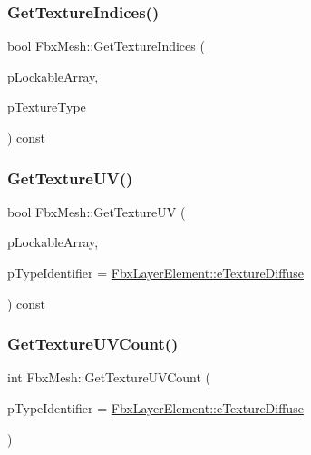 \subsubsection{\texorpdfstring{Get\+Texture\+Indices()}{GetTextureIndices()}}
{\footnotesize\ttfamily bool Fbx\+Mesh\+::\+Get\+Texture\+Indices (\begin{DoxyParamCaption}\item[{\hyperlink{class_fbx_layer_element_array_template}{Fbx\+Layer\+Element\+Array\+Template}$<$ int $>$ $\ast$$\ast$}]{p\+Lockable\+Array,  }\item[{\hyperlink{class_fbx_layer_element_a8c95c5cd880b56c776acd379bd86f42c}{Fbx\+Layer\+Element\+::\+E\+Type}}]{p\+Texture\+Type }\end{DoxyParamCaption}) const}

\mbox{\label{class_fbx_mesh_acb576494ab0812b3a81207d4b3423a5c}} 
\subsubsection{\texorpdfstring{Get\+Texture\+U\+V()}{GetTextureUV()}}
{\footnotesize\ttfamily bool Fbx\+Mesh\+::\+Get\+Texture\+UV (\begin{DoxyParamCaption}\item[{\hyperlink{class_fbx_layer_element_array_template}{Fbx\+Layer\+Element\+Array\+Template}$<$ \hyperlink{class_fbx_vector2}{Fbx\+Vector2} $>$ $\ast$$\ast$}]{p\+Lockable\+Array,  }\item[{\hyperlink{class_fbx_layer_element_a8c95c5cd880b56c776acd379bd86f42c}{Fbx\+Layer\+Element\+::\+E\+Type}}]{p\+Type\+Identifier = {\ttfamily \hyperlink{class_fbx_layer_element_a8c95c5cd880b56c776acd379bd86f42ca09829e6ecf512e7ae04d9ad8de1342fa}{Fbx\+Layer\+Element\+::e\+Texture\+Diffuse}} }\end{DoxyParamCaption}) const}

\mbox{\label{class_fbx_mesh_a8a32eaf0ce16becd8e7de6c2783e61b9}} 
\subsubsection{\texorpdfstring{Get\+Texture\+U\+V\+Count()}{GetTextureUVCount()}}
{\footnotesize\ttfamily int Fbx\+Mesh\+::\+Get\+Texture\+U\+V\+Count (\begin{DoxyParamCaption}\item[{\hyperlink{class_fbx_layer_element_a8c95c5cd880b56c776acd379bd86f42c}{Fbx\+Layer\+Element\+::\+E\+Type}}]{p\+Type\+Identifier = {\ttfamily \hyperlink{class_fbx_layer_element_a8c95c5cd880b56c776acd379bd86f42ca09829e6ecf512e7ae04d9ad8de1342fa}{Fbx\+Layer\+Element\+::e\+Texture\+Diffuse}} }\end{DoxyParamCaption})}

